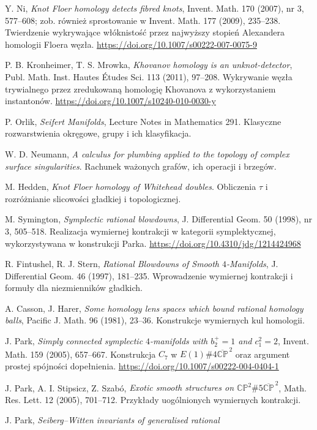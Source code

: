 \begin{enumerate}[label={[\arabic*]},leftmargin=*,itemsep=3pt]
\item Y. Ni, \emph{Knot Floer homology detects fibred knots},
Invent. Math. 170 (2007), nr 3, 577--608;
zob. również sprostowanie w Invent. Math. 177 (2009), 235--238.
Twierdzenie wykrywające włóknistość przez najwyższy
stopień Alexandera homologii Floera węzła.
\url{https://doi.org/10.1007/s00222-007-0075-9}
\item P. B. Kronheimer, T. S. Mrowka,
\emph{Khovanov homology is an unknot-detector},
Publ. Math. Inst. Hautes Études Sci. 113 (2011), 97--208.
Wykrywanie węzła trywialnego przez zredukowaną
homologię Khovanova z wykorzystaniem instantonów.
\url{https://doi.org/10.1007/s10240-010-0030-y}
\item P. Orlik, \emph{Seifert Manifolds}, Lecture Notes in Mathematics 291.
Klasyczne rozwarstwienia okręgowe, grupy i ich klasyfikacja.
\item W. D. Neumann, \emph{A calculus for plumbing applied to the topology of complex surface singularities}.
Rachunek ważonych grafów, ich operacji i brzegów.
\item M. Hedden, \emph{Knot Floer homology of Whitehead doubles}.
Obliczenia $\tau$ i rozróżnianie slicowości gładkiej i topologicznej.
\item M. Symington, \emph{Symplectic rational blowdowns},
J. Differential Geom. 50 (1998), nr 3, 505--518.
Realizacja wymiernej kontrakcji
w kategorii symplektycznej,
wykorzystywana w konstrukcji Parka.
\url{https://doi.org/10.4310/jdg/1214424968}
\item R. Fintushel, R. J. Stern, \emph{Rational Blowdowns of Smooth
$4$-Manifolds}, J. Differential Geom. 46 (1997), 181--235.
Wprowadzenie wymiernej kontrakcji i formuły dla niezmienników gładkich.
\item A. Casson, J. Harer, \emph{Some homology lens spaces which bound
rational homology balls}, Pacific J. Math. 96 (1981), 23--36.
Konstrukcje wymiernych kul homologii.
\item J. Park, \emph{Simply connected symplectic $4$-manifolds with $b_2^+=1$ and $c_1^2=2$}, Invent. Math. 159 (2005), 657--667. Konstrukcja $C_7$ w $E(1)\#4\overline{\mathbb{CP}}^{\,2}$ oraz argument prostej spójności dopełnienia. \url{https://doi.org/10.1007/s00222-004-0404-1}
\item J. Park, A. I. Stipsicz, Z. Szabó, \emph{Exotic smooth structures
on $\mathbb{CP}^2\#5\overline{\mathbb{CP}}^{\,2}$},
Math. Res. Lett. 12 (2005), 701--712.
Przykłady uogólnionych wymiernych kontrakcji.
\item J. Park, \emph{Seiberg--Witten invariants of generalised rational
}
\end{enumerate}
